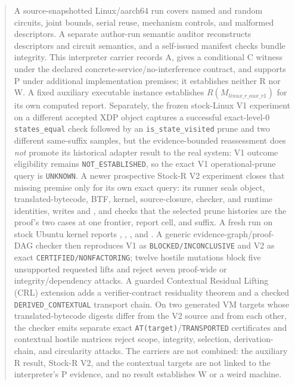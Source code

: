 \documentclass[conference]{IEEEtran}
\begin{document}
\begin{abstract}
A source-snapshotted Linux/aarch64 run covers named and random circuits, joint bounds, serial reuse, mechanism controls, and malformed descriptors. A separate author-run semantic auditor reconstructs descriptors and circuit semantics, and a self-issued manifest checks bundle integrity. This interpreter carrier records A, gives a conditional C witness under the declared concrete-service/no-interference contract, and supports P under additional implementation premises; it establishes neither R nor W. A fixed auxiliary executable instance establishes $R(M_{\mathit{linux\_r\_aux\_v1}})$ for its own computed report. Separately, the frozen stock-Linux V1 experiment on a different accepted XDP object captures a successful exact-level-0 \texttt{states\_equal} check followed by an \texttt{is\_state\_visited} prune and two different same-suffix samples, but the evidence-bounded reassessment does \emph{not} promote its historical adapter result to the real system: V1 outcome eligibility remains \texttt{NOT\_ESTABLISHED}, so the exact V1 operational-prune query is \texttt{UNKNOWN}. A newer prospective Stock-R V2 experiment closes that missing premise only for its own exact query: its runner seals object, translated-bytecode, BTF, kernel, source-closure, checker, and runtime identities, writes  and , and checks that the selected prune histories are the proof's two cases at one frontier, report cell, and suffix. A fresh run on stock Ubuntu kernel  reports , , , and . A generic evidence-graph/proof-DAG checker then reproduces V1 as \texttt{BLOCKED/INCONCLUSIVE} and V2 as exact \texttt{CERTIFIED/NONFACTORING}; twelve hostile mutations block five unsupported requested lifts and reject seven proof-wide or integrity/dependency attacks. A guarded Contextual Residual Lifting (CRL) extension adds a verifier-contract residuality theorem and a checked \texttt{DERIVED\_CONTEXTUAL} transport chain. On two generated VM targets whose translated-bytecode digests differ from the V2 source and from each other, the checker emits separate exact \texttt{AT(target)}/\texttt{TRANSPORTED} certificates and contextual hostile matrices reject scope, integrity, selection, derivation-chain, and circularity attacks. The carriers are not combined: the auxiliary R result, Stock-R V2, and the contextual targets are not linked to the interpreter's P evidence, and no result establishes W or a weird machine.


\end{abstract}
\end{document}
